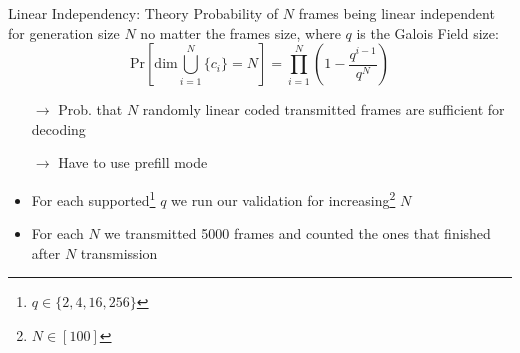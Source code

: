 \documentclass[t]{beamer} %
\begin{document}
\begin{frame}{Linear Independency: Theory}
	Probability of $N$ frames being linear independent for generation size $N$ no matter the frames size, where $q$ is the Galois Field size:%
	\begin{equation} 
		\text{Pr}\left[\text{dim}\bigcup_{i=1}^{N}\{c_i\} = N\right] = \prod_{i=1}^{N} \left(1 - \frac{q^{i - 1}}{q ^ {N}}\right)
		\label{eq:decode_prob}
	\end{equation}
	\begin{itemize}
		\item[$\rightarrow$] Prob. that $N$ randomly linear coded transmitted frames are sufficient for decoding
		\item[$\rightarrow$] Have to use prefill mode
		\item For each supported\footnote{$q\in\{2, 4, 16, 256\}$} $q$ we run our validation for increasing\footnote{$N\in[100]$} $N$
		\item For each $N$ we transmitted 5000 frames and counted the ones that finished after $N$ transmission
	\end{itemize}
\end{frame}
\end{document}
